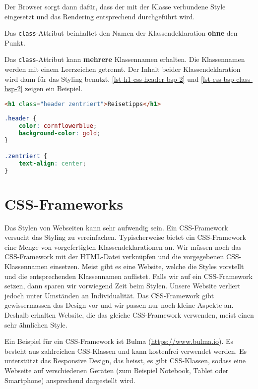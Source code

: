 Der Browser sorgt dann dafür, dass der mit der Klasse verbundene Style eingesetzt und das Rendering entsprechend durchgeführt wird. 

\begin{important}
	Das \lstinline{class}-Attribut beinhaltet den Namen der Klassendeklaration \textbf{ohne} den Punkt.
\end{important}

Das \lstinline{class}-Attribut kann \textbf{mehrere} Klassennamen erhalten. Die Klassennamen werden mit einem Leerzeichen getrennt. Der Inhalt beider Klassendeklaration wird dann für das Styling benutzt. \autoref{lst-h1-css-header-bsp-2} und \autoref{lst-css-bsp-class-bsp-2} zeigen ein Beispiel.

\begin{lstlisting}[language=HTML, caption={Das \lstinline{h1}-Element verwendet die Klassen \lstinline{header} und \lstinline{zentriert}.}, label={lst-h1-css-header-bsp-2}]
<h1 class="header zentriert">Reisetipps</h1>
\end{lstlisting}

\begin{lstlisting}[language=CSS, caption={Zwei Klassendefinition in der Datei \texttt{style.css}.}, label={lst-css-bsp-class-bsp-2}]
.header {
    color: cornflowerblue;
    background-color: gold;
}

.zentriert {
    text-align: center;
}
\end{lstlisting}

\section{\acs{CSS}-Frameworks}

Das Stylen von Webseiten kann sehr aufwendig sein. Ein \ac{CSS}-Framework versucht das Styling zu vereinfachen. Typischerweise bietet ein \ac{CSS}-Framework eine Menge von vorgefertigten Klassendeklarationen an. Wir müssen  noch das \ac{CSS}-Framework mit der \ac{HTML}-Datei verknüpfen und die vorgegebenen \ac{CSS}-Klassennamen einsetzen. Meist gibt es eine Website, welche die Styles vorstellt und die entsprechenden Klassennamen auflistet. Falls wir auf ein \ac{CSS}-Framework setzen, dann sparen wir vorwiegend Zeit beim Stylen. Unsere Website verliert jedoch unter Umständen an Individualität. Das \ac{CSS}-Framework gibt gewissermassen das Design vor und wir passen nur noch kleine Aspekte an. Deshalb erhalten Website, die das gleiche \ac{CSS}-Framework verwenden, meist einen sehr ähnlichen Style.

\begin{example}[Bulma]
Ein Beispiel für ein \ac{CSS}-Framework ist Bulma (\url{https://www.bulma.io}). Es besteht aus zahlreichen \ac{CSS}-Klassen und kann kostenfrei verwendet werden. Es unterstützt das Responsive Design, das heisst, es gibt \ac{CSS}-Klassen, sodass eine Webseite auf verschiedenen Geräten (zum Beispiel Notebook, Tablet oder Smartphone) ansprechend dargestellt wird.
\end{example}